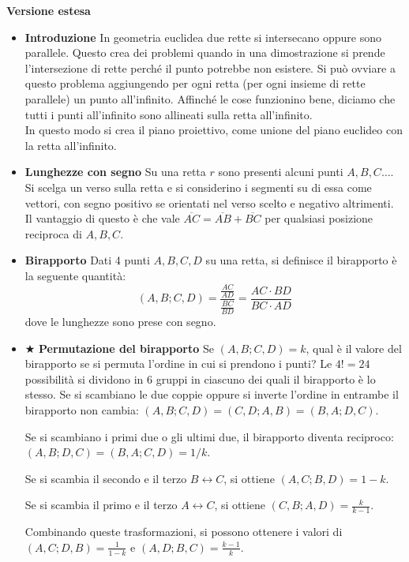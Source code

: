 \vspace{0.3cm}
\large{\textbf{Versione estesa}}\normalsize
\begin{itemize}

\vspace{0.3cm}
\item \textbf{Introduzione} In geometria euclidea due rette si intersecano oppure sono parallele. Questo crea dei problemi quando in una dimostrazione si prende l'intersezione di rette perché il punto potrebbe non esistere. Si può ovviare a questo problema aggiungendo per ogni retta (per ogni insieme di rette parallele) un punto all'infinito.  Affinché le cose funzionino bene, diciamo che tutti i punti all'infinito sono allineati sulla retta all'infinito.\\
In questo modo si crea il piano proiettivo, come unione del piano euclideo con la retta all'infinito.


\item \textbf{Lunghezze con segno} Su una retta $r$ sono presenti alcuni punti $A,B,C\ldots$. Si scelga un verso sulla retta e si considerino i segmenti su di essa come vettori, con segno positivo se orientati nel verso scelto e negativo altrimenti. Il vantaggio di questo è che vale $\overline{AC}=\overline{AB}+\overline{BC}$ per qualsiasi posizione reciproca di $A,B,C$.

\item \textbf{Birapporto} Dati 4 punti $A,B,C,D$ su una retta, si definisce il birapporto è la seguente quantità:
$$(A,B;C,D)=\frac{\frac{AC}{AD}}{\frac{BC}{BD}}=\frac{AC\cdot BD}{BC\cdot AD}$$
dove le lunghezze sono prese con segno.

\item $\bigstar$ \textbf{Permutazione del birapporto} Se $(A,B;C,D)=k$, qual è il valore del birapporto se si permuta l'ordine in cui si prendono i punti? Le $4!=24$ possibilità si dividono in $6$ gruppi in ciascuno dei quali il birapporto è lo stesso. Se si scambiano le due coppie oppure si inverte l'ordine in entrambe il birapporto non cambia: $(A,B;C,D)=(C,D;A,B)=(B,A;D,C)$.

Se si scambiano i primi due o gli ultimi due, il birapporto diventa reciproco: $(A,B;D,C)=(B,A;C,D)=1/k$.

Se si scambia il secondo e il terzo $B \leftrightarrow C$, si ottiene $(A,C;B,D)=1-k$.

Se si scambia il primo e il terzo $A \leftrightarrow C$, si ottiene $(C,B;A,D)=\frac{k}{k-1}$.


Combinando queste trasformazioni, si possono ottenere i valori di $(A,C;D,B)=\frac{1}{1-k}$ e $(A,D;B,C)=\frac{k-1}{k}$.


\end{itemize}
